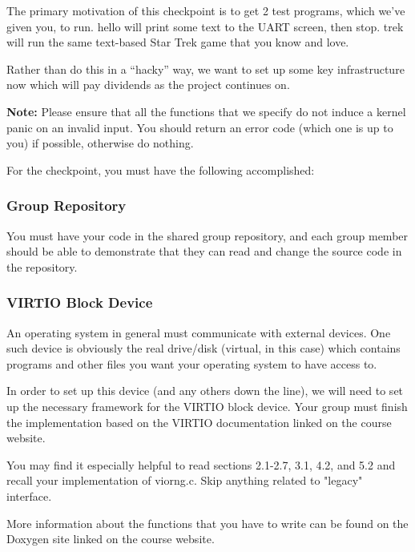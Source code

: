 \documentclass{article}
\begin{document}
\bigbreak{}


%
\ifnum{}
	The primary motivation of this checkpoint is to get 2 test programs, which we've
	given you, to run. {\fix hello} will print some text to the UART screen, then stop.
	{\fix trek} will run the same text-based Star Trek game that you know and love.

	Rather than do this in a ``hacky'' way, we want to set up some key infrastructure
	now which will pay dividends as the project continues on.

	\textbf{Note:} Please ensure that all the functions that we specify do not induce a kernel panic
	on an invalid input. You should return an error code (which one is up to you) if possible, otherwise
	do nothing.

	For the checkpoint, you must have the following accomplished:

	\subsubsection{Group Repository}
	You must have your code in the shared group repository, and each group
	member should be able to demonstrate that they can read and change the
	source code in the repository.

	\subsubsection{VIRTIO Block Device}
	An operating system in general must communicate with external devices. One such
	device is obviously the real drive/disk (virtual, in this case) which contains programs
	and other files you want your operating system to have access to.

	In order to set up this device (and any others down the line), we will need to set up
	the necessary framework for the VIRTIO block device. Your group must finish the implementation based on the VIRTIO documentation linked on the course website.

	You may find it especially helpful to read sections 2.1-2.7, 3.1, 4.2, and 5.2 and recall your implementation of {\fix viorng.c}. Skip anything related to "legacy" interface.

	More information about the functions that you have to write can be found on the Doxygen site linked on the course website.
\end{document}
